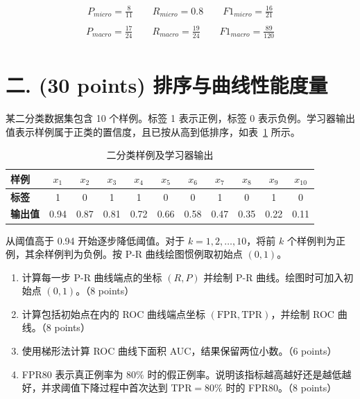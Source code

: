 \documentclass[8pt]{article}
\begin{document}
{\large
\begin{gather*}
P_{micro} = \frac{8}{11}
\qquad
R_{micro} = 0.8
\qquad
F1_{micro} =\frac{16}{21} \\
\end{gather*}
}
{\large
\begin{gather*}
P_{macro} = \frac{17}{24}
\qquad
R_{macro} = \frac{19}{24}
\qquad
F1_{macro} =\frac{89}{120} \\
\end{gather*}
}

\clearpage
\section*{二. (30 points) 排序与曲线性能度量}

某二分类数据集包含 10 个样例。标签 1 表示正例，标签 0 表示负例。学习器输出值表示样例属于正类的置信度，且已按从高到低排序，如表~\ref{tab:scores} 所示。

\begin{table}[H]
\centering
\small
\setlength{\tabcolsep}{4.4pt}
\begin{tabular}{l*{10}{c}}
\toprule
\textbf{样例} & $x_1$ & $x_2$ & $x_3$ & $x_4$ & $x_5$ & $x_6$ & $x_7$ & $x_8$ & $x_9$ & $x_{10}$ \\
\midrule
\textbf{标签} & 1 & 0 & 1 & 1 & 0 & 0 & 1 & 0 & 1 & 0 \\
\textbf{输出值} & 0.94 & 0.87 & 0.81 & 0.72 & 0.66 & 0.58 & 0.47 & 0.35 & 0.22 & 0.11 \\
\bottomrule
\end{tabular}
\caption{二分类样例及学习器输出}
\label{tab:scores}
\end{table}

从阈值高于 0.94 开始逐步降低阈值。对于 $k=1,2,\ldots,10$，将前 $k$ 个样例判为正例，其余样例判为负例。按 P-R 曲线绘图惯例取初始点 $(0,1)$。

\begin{enumerate}[leftmargin=2.2em,itemsep=0.55em]
  \item 计算每一步 P-R 曲线端点的坐标 $(R,P)$ 并绘制 P-R 曲线。绘图时可加入初始点 $(0,1)$。（8 points）
  \item 计算包括初始点在内的 ROC 曲线端点坐标 $(\mathrm{FPR},\mathrm{TPR})$，并绘制 ROC 曲线。（8 points）
  \item 使用梯形法计算 ROC 曲线下面积 AUC，结果保留两位小数。（6 points）
  \item FPR80 表示真正例率为 $80\%$ 时的假正例率。说明该指标越高越好还是越低越好，并求阈值下降过程中首次达到 $\mathrm{TPR}=80\%$ 时的 FPR80。（8 points）
\end{enumerate}
\end{document}
